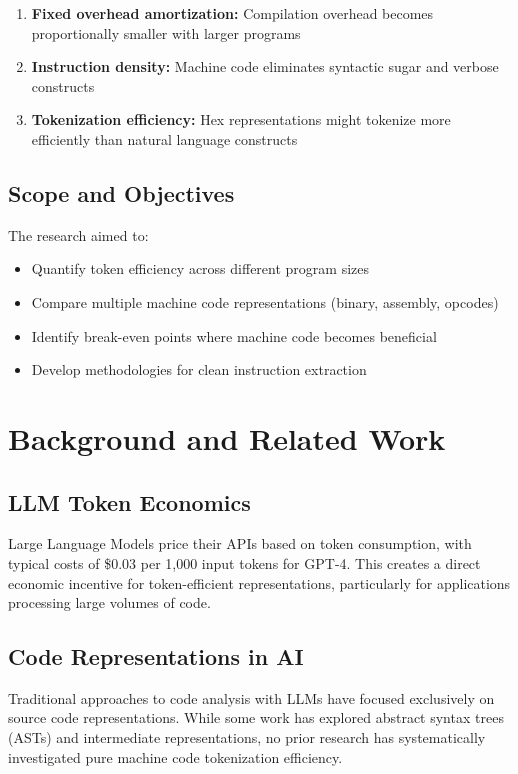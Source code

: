 \documentclass[11pt,a4paper]{article}
\begin{document}
\begin{enumerate}
    \item \textbf{Fixed overhead amortization:} Compilation overhead becomes proportionally smaller with larger programs
    \item \textbf{Instruction density:} Machine code eliminates syntactic sugar and verbose constructs
    \item \textbf{Tokenization efficiency:} Hex representations might tokenize more efficiently than natural language constructs
\end{enumerate}

\subsection{Scope and Objectives}
The research aimed to:
\begin{itemize}
    \item Quantify token efficiency across different program sizes
    \item Compare multiple machine code representations (binary, assembly, opcodes)
    \item Identify break-even points where machine code becomes beneficial
    \item Develop methodologies for clean instruction extraction
\end{itemize}

\section{Background and Related Work}

\subsection{LLM Token Economics}
Large Language Models price their APIs based on token consumption, with typical costs of \$0.03 per 1,000 input tokens for GPT-4. This creates a direct economic incentive for token-efficient representations, particularly for applications processing large volumes of code.

\subsection{Code Representations in AI}
Traditional approaches to code analysis with LLMs have focused exclusively on source code representations. While some work has explored abstract syntax trees (ASTs) and intermediate representations, no prior research has systematically investigated pure machine code tokenization efficiency.
\end{document}

